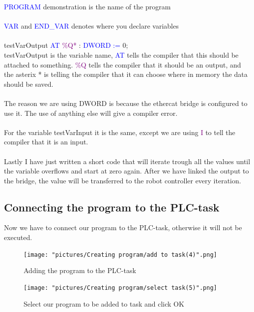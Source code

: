 \documentclass{article}
\begin{document}
\noindent
\textcolor{blue}{PROGRAM}  demonstration is the name of the program
\\\\
\textcolor{blue}{VAR} and \textcolor{blue}{END\_VAR} denotes where you declare variables
\\\\
testVarOutput \textcolor{blue}{AT} \textcolor{purple}{\%Q*} : \textcolor{blue}{DWORD :=} 0;
\\
testVarOutput is the variable name, \textcolor{blue}{AT} tells the compiler that this should be attached to something. \textcolor{purple}{\%Q} tells the compiler that it should be an output, and the asterix * is telling the compiler that it can choose where in memory the data should be saved.    
\\\\
The reason we are using DWORD is because the ethercat bridge is configured to use it. The use of anything else will give a compiler error. 
\\\\
For the variable testVarInput it is the same, except we are using \textcolor{purple}{I} to tell the compiler that it is an input.
\\\\
Lastly I have just written a short code that will iterate trough all the values until the variable overflows and start at zero again. After we have linked the output to the bridge, the value will be transferred to the robot controller every iteration.

\subsection{Connecting the program to the PLC-task}

 Now we have to connect our program to the PLC-task, otherwise it will not be executed. 
 
 \begin{figure}[!h]
     \centering
     \texttt{[image: "pictures/Creating program/add to task(4)".png]}
     \caption{Adding the program to the PLC-task}
     
 \end{figure}

\begin{figure}[!h]
    \centering
    \texttt{[image: "pictures/Creating program/select task(5)".png]}
    \caption{Select our program to be added to task and click OK}
    
\end{figure}
\end{document}
